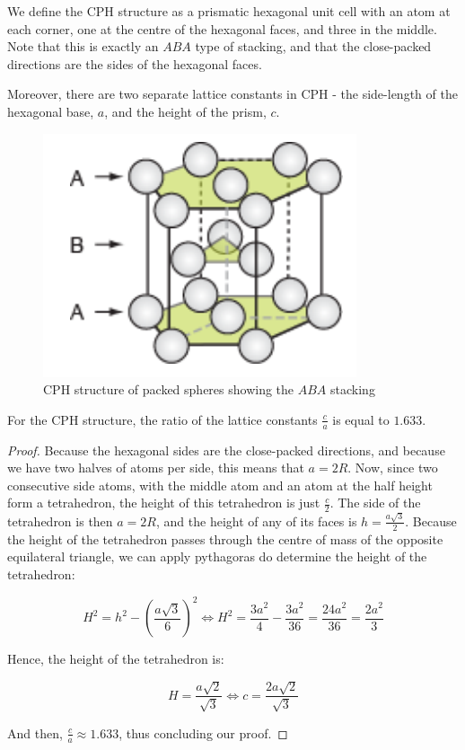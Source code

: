 \documentclass{article}
\begin{document}
\begin{definition}
    We define the CPH structure as a prismatic hexagonal unit cell with an atom at each corner, one at the centre of the hexagonal faces, and three in the middle. Note that this is exactly an $ABA$ type of stacking, and that the close-packed directions are the sides of the hexagonal faces.
\end{definition}

Moreover, there are two separate lattice constants in CPH - the side-length of the hexagonal base, $a$, and the height of the prism, $c$. 

\begin{figure}[h]
    \centering
    \includegraphics{images/mat6.png}
    \caption{CPH structure of packed spheres showing the $ABA$ stacking}
    \label{fig:enter-label}
\end{figure}

\begin{proposition}
    For the CPH structure, the ratio of the lattice constants $\frac{c}{a}$ is equal to $1.633$.
\end{proposition}

\begin{proof}
    Because the hexagonal sides are the close-packed directions, and because we have two halves of atoms per side, this means that $a = 2R$. Now, since two consecutive side atoms, with the middle atom and an atom at the half height form a tetrahedron, the height of this tetrahedron is just $\frac{c}{2}$. The side of the tetrahedron is then $a = 2R$, and the height of any of its faces is $h = \frac{a\sqrt{3}}{2}$. Because the height of the tetrahedron passes through the centre of mass of the opposite equilateral triangle, we can apply pythagoras do determine the height of the tetrahedron:

    \[ H^2 = h^2 - \left(\frac{a\sqrt{3}}{6}\right)^2 \iff H^2 = \frac{3a^2}{4} - \frac{3a^2}{36} = \frac{24a^2}{36} = \frac{2a^2}{3}\]

    Hence, the height of the tetrahedron is:

    \[ H = \frac{a\sqrt{2}}{\sqrt{3}} \iff c = \frac{2a\sqrt{2}}{\sqrt{3}} \]

    And then, $\frac{c}{a} \approx 1.633$, thus concluding our proof.
\end{proof}
\end{document}
